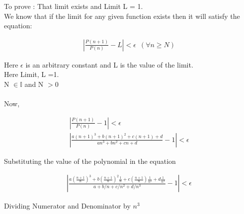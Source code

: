 \documentclass[11pt, letterpaper]{article}
\begin{document}
\begin{enumerate}
{		To prove : That limit exists and Limit L = 1.\\
		We know that if the limit for any given function exists then it will satisfy the equation:
		
		\setcounter{equation}{0}
		
		\begin{eqnarray}
			\left| \frac{P(n+1)}{P(n)} - L \right| < \epsilon \,\,\, (\forall n \geq N)
		\end{eqnarray}						
		
		Here $\epsilon$ is an arbitrary constant and L is the value of the limit.\\
		Here Limit, L =1.\\
		N $\in \mathbb{I}$ and N $ > 0$\\\\
		Now,
		
		\begin{eqnarray}
			\left| \frac{P(n+1)}{P(n)} - 1 \right| < \epsilon \\
			\left| \frac{a(n+1)^3 + b(n+1)^2 + c(n+1) + d}{an^3 + bn^2 + cn + d} - 1\right| < \epsilon \nonumber 
		\end{eqnarray}
		
		\begin{center}
			Substituting the value of the polynomial in the equation
		\end{center}
		
		\begin{eqnarray}
			\left| \frac{a (\frac{n+1}{n})^3 + b(\frac{n+1}{n})^2\frac{1}{n} + c(\frac{n+1}{n})\frac{1}{n^2} + d\frac{1}{n^3}}{a + b/n + c/n^2 + d/n^3} - 1\right| < \epsilon \nonumber	
		\end{eqnarray}
		
		\begin{center}
			Dividing Numerator and Denominator by $n^3$
		\end{center}
	}
\end{enumerate}
\clearpage
\end{document}
